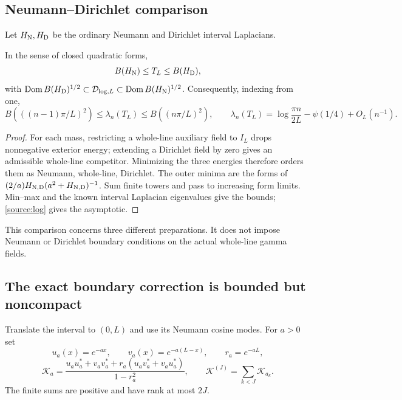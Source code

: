 \subsection{Neumann--Dirichlet comparison}
Let $H_{\rm N},H_{\rm D}$ be the ordinary Neumann and Dirichlet
interval Laplacians.
\begin{theorem}\label{source:bracket}
In the sense of closed quadratic forms,
\[
B(H_{\rm N})\le T_L\le B(H_{\rm D}),
\]
with
$\operatorname{Dom} B(H_{\rm D})^{1/2}\subset\mathcal D_{\log,L}
\subset\operatorname{Dom} B(H_{\rm N})^{1/2}$. Consequently, indexing from one,
\begin{equation}\label{source:eigenvalues}
B(((n-1)\pi/L)^2)\le\lambda_n(T_L)\le B((n\pi/L)^2),
\qquad
\lambda_n(T_L)=\log\frac{\pi n}{2L}-\psi(1/4)+O_L(n^{-1}).
\end{equation}
\end{theorem}
\begin{proof}
For each mass, restricting a whole-line auxiliary field to $I_L$
drops nonnegative exterior energy; extending a Dirichlet field
by zero gives an admissible whole-line competitor. Minimizing
the three energies therefore orders them as Neumann, whole-line,
Dirichlet. The outer minima are the forms of
$(2/a)H_{\rm N,D}(a^2+H_{\rm N,D})^{-1}$.
Sum finite towers and pass to increasing form limits. Min--max
and the known interval Laplacian eigenvalues give the bounds;
\eqref{source:log} gives the asymptotic.
\end{proof}
This comparison concerns three different preparations. It does
not impose Neumann or Dirichlet boundary conditions on the actual
whole-line gamma fields.

\subsection{The exact boundary correction is bounded but noncompact}
Translate the interval to $(0,L)$ and use its Neumann cosine modes.
For $a>0$ set
\[
u_a(x)=e^{-ax},\qquad v_a(x)=e^{-a(L-x)},\qquad r_a=e^{-aL},
\]
\begin{equation}\label{boundary:mass}
\mathcal K_a=
\frac{u_au_a^*+v_av_a^*+r_a(u_av_a^*+v_au_a^*)}{1-r_a^2},
\qquad \mathcal K^{(J)}=\sum_{k<J}\mathcal K_{a_k}.
\end{equation}
The finite sums are positive and have rank at most $2J$.

